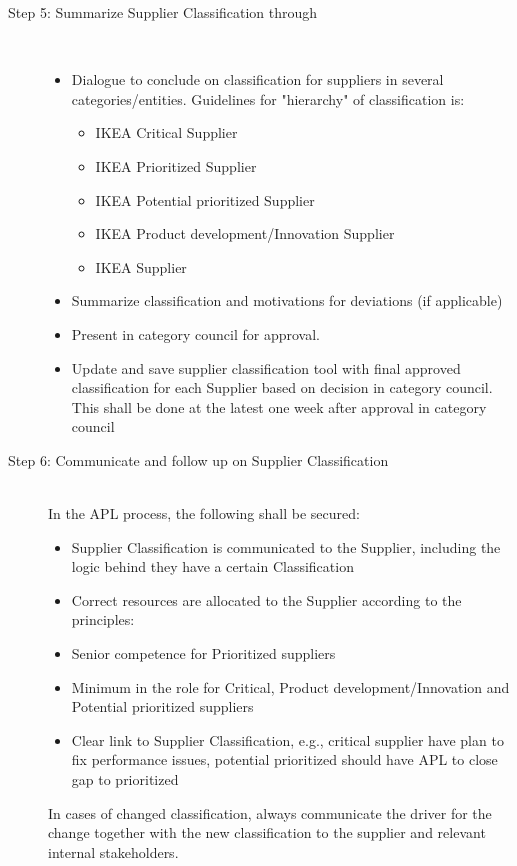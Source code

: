 \documentclass[oneside,12pt]{article}%
\begin{document}
\begin{description}
  \item[Step 5: Summarize Supplier Classification through] \hfill \\
  \begin{itemize}
    \item Dialogue to conclude on classification for suppliers in several categories/entities. Guidelines for "hierarchy" of classification is:
      \begin{itemize}
      \item IKEA Critical Supplier
      \item IKEA Prioritized Supplier
      \item IKEA Potential prioritized Supplier
      \item IKEA Product development/Innovation Supplier
      \item IKEA Supplier
      \end{itemize}
    \item Summarize classification and motivations for deviations (if applicable)
    \item Present in category council for approval.
    \item Update and save supplier classification tool with final approved classification for each Supplier based on decision in category council. This shall be done at the latest one week after approval in category council

  \end{itemize}
  \item[Step 6: Communicate and follow up on Supplier Classification ] \hfill \\
  In the APL process, the following shall be secured:
  \begin{itemize}
    \item Supplier Classification is communicated to the Supplier, including the logic behind they have a certain Classification
    \item Correct resources are allocated to the Supplier according to the principles:
    \item Senior competence for Prioritized suppliers
    \item Minimum in the role for Critical, Product development/Innovation and Potential prioritized suppliers
    \item Clear link to Supplier Classification, e.g., critical supplier have plan to fix performance issues, potential prioritized should have APL to close gap to prioritized
  \end{itemize}
  In cases of changed classification, always communicate the driver for the change together with the new classification to the supplier and relevant internal stakeholders.

\end{description}
\end{document}
